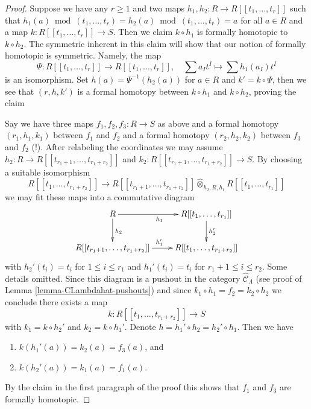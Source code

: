 \documentclass[10pt,a4paper]{amsart}
\theoremstyle{plain}
\theoremstyle{definition}
\theoremstyle{remark}
\numberwithin{equation}{subsection}
\begin{document}
\begin{proof}
Suppose we have any $r \geq 1$ and two maps
$h_1, h_2 : R \to R[[t_1, \ldots, t_r]]$ such that
$h_1(a) \bmod (t_1, \ldots, t_r) =  h_2(a) \bmod (t_1, \ldots, t_r) = a$
for all $a \in R$ and a map $k : R[[t_1, \ldots, t_r]] \to S$.
Then we claim $k \circ h_1$ is formally homotopic to $k \circ h_2$.
The symmetric inherent in this claim will show that our notion
of formally homotopic is symmetric. Namely, the map
$$
\Psi :
R[[t_1, \ldots, t_r]]
\longrightarrow
R[[t_1, \ldots, t_r]],\quad
\sum a_I t^I \longmapsto \sum h_1(a_I)t^I
$$
is an isomorphism. Set $h(a) = \Psi^{-1}(h_2(a))$ for $a \in R$ and
$k' = k \circ \Psi$, then we see that $(r, h, k')$ is a formal
homotopy between $k \circ h_1$ and $k \circ h_2$, proving the claim

\medskip\noindent
Say we have three maps $f_1, f_2, f_3 : R \to S$ as above
and a formal homotopy $(r_1, h_1, k_1)$ between $f_1$ and $f_2$
and a formal homotopy $(r_2, h_2, k_2)$ between $f_3$ and $f_2$ (!).
After relabeling the coordinates we may assume
$h_2 : R \to R[[t_{r_1 + 1}, \ldots, t_{r_1 + r_2}]]$
and
$k_2 : R[[t_{r_1 + 1}, \ldots, t_{r_1 + r_2}]] \to S$.
By choosing a suitable isomorphism
$$
R[[t_1, \ldots, t_{r_1 + r_2}]]
\longrightarrow
R[[t_{r_1 + 1}, \ldots, t_{r_1 + r_2}]]
\widehat{\otimes}_{h_2, R, h_1}
R[[t_1, \ldots, t_{r_1}]]
$$
we may fit these maps into a commutative diagram
$$
\xymatrix{
R \ar[r]_{h_1} \ar[d]^{h_2} &
R[[t_1, \ldots, t_{r_1}]] \ar[d]^{h_2'} \\
R[[t_{r_1 + 1}, \ldots, t_{r_1 + r_2}]] \ar[r]^{h_1'} &
R[[t_1, \ldots, t_{r_1 + r_2}]]
}
$$
with $h_2'(t_i) = t_i$ for $1 \leq i \leq r_1$ and
$h_1'(t_i) = t_i$ for $r_1 + 1 \leq i \leq r_2$.
Some details omitted.
Since this diagram is a pushout in the category
$\widehat{\mathcal{C}}_\Lambda$ (see proof of
Lemma \ref{lemma-CLambdahat-pushouts})
and since $k_1 \circ h_1 = f_2 = k_2 \circ h_2$ we conclude
there exists a map
$$
k : R[[t_1, \ldots, t_{r_1 + r_2}]] \to S
$$
with $k_1 = k \circ h_2'$ and $k_2 = k \circ h_1'$.
Denote $h = h_1' \circ h_2 = h_2' \circ h_1$.
Then we have
\begin{enumerate}
\item $k(h_1'(a)) = k_2(a) = f_3(a)$, and
\item $k(h_2'(a)) = k_1(a) = f_1(a)$.
\end{enumerate}
By the claim in the first paragraph of the proof this shows that
$f_1$ and $f_3$ are formally homotopic.
\end{proof}
\end{document}
